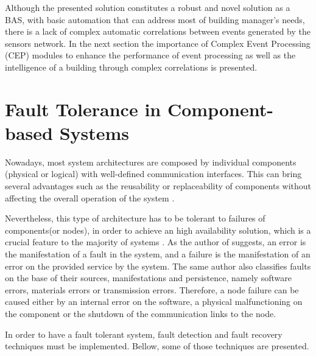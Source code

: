 Although the presented solution constitutes a robust and novel solution as a BAS, with basic automation that can address most of building manager’s needs, there is a lack of complex automatic correlations between events generated by the sensors network. In the next section the importance of Complex Event Processing (CEP) modules to enhance the performance of event processing as well as the intelligence of a building through complex correlations is presented.



\section{Fault Tolerance in Component-based Systems}

Nowadays, most system architectures are composed by individual components (physical or logical) with well-defined communication interfaces. This can bring several advantages such as the reusability or replaceability of components without affecting the overall operation of the system \cite{TutorialsPoint}.

Nevertheless, this type of architecture has to be tolerant to failures of components(or nodes), in order to achieve an high availability solution, which is a crucial feature to the majority of systems \cite{Sun2014a}. As the author of \cite{Zaiter2013} suggests, an error is the manifestation of a fault in the system, and a failure is the manifestation of an error on the provided service by the system. The same author also classifies faults on the base of their sources, manifestations and persistence, namely software errors, materials errors or transmission errors. Therefore, a node failure can be caused either by an internal error on the software, a physical malfunctioning on the component or the shutdown of the communication links to the node.

In order to have a fault tolerant system, fault detection and fault recovery techniques must be implemented. Bellow, some of those techniques are presented.

